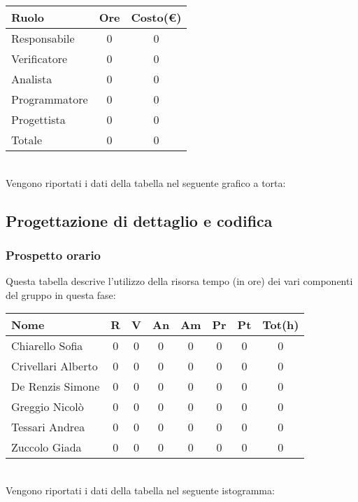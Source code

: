 \begin{tabular}{|l|c|c|}
\hline
Ruolo & Ore & Costo(€)\\
\hline
Responsabile & 0 & 0\\
Verificatore & 0 & 0\\
Analista & 0 & 0\\
Programmatore & 0 & 0\\
Progettista & 0 & 0\\
Totale & 0& 0\\
\hline
\end{tabular}\\


Vengono riportati i dati della tabella nel seguente grafico a torta: \\



\subsection{Progettazione di dettaglio e codifica}

\subsubsection{Prospetto orario}
Questa tabella descrive l'utilizzo della risorsa tempo (in ore) dei vari componenti del gruppo in questa fase: \\

\begin{tabular}{|l|cccccc|c|}
\hline
Nome & R &  V & An & Am & Pr & Pt & Tot(h)\\
\hline
Chiarello Sofia & 0 & 0 & 0 & 0 & 0 & 0 & 0\\
Crivellari Alberto & 0 & 0 & 0 & 0 & 0 & 0 & 0\\
De Renzis Simone & 0 & 0 & 0 & 0 & 0 & 0 & 0\\
Greggio Nicolò & 0 & 0 & 0 & 0 & 0 & 0 & 0\\
Tessari Andrea & 0 & 0 & 0 & 0 & 0 & 0 & 0\\
Zuccolo Giada & 0 & 0 & 0 & 0 & 0 & 0 & 0\\
\hline
\end{tabular}
\\
Vengono riportati i dati della tabella nel seguente istogramma: \\

